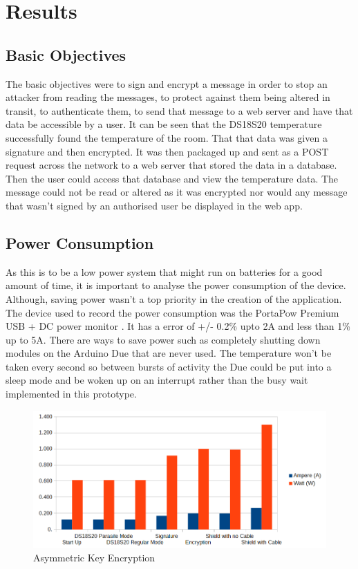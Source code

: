 \chapter{Results}
\label{res}



\section{Basic Objectives}

The basic objectives were to sign and encrypt a message in order to stop an attacker from reading the messages, to protect against them being altered in transit, to authenticate them, to send that message to a web server and have that data be accessible by a user. It can be seen that the DS18S20 temperature successfully found the temperature of the room. That that data was given a signature and then encrypted. It was then packaged up and sent as a POST request across the network to a web server that stored the data in a database. Then the user could access that database and view the temperature data. The message could not be read or altered as it was encrypted nor would any message that wasn't signed by an authorised user be displayed in the web app.

\section{Power Consumption}

As this is to be a low power system that might run on batteries for a good amount of time, it is important to analyse the power consumption of the device. Although, saving power wasn't a top priority in the creation of the application. The device used to record the power consumption was the PortaPow Premium USB + DC power monitor \cite{portapow}. It has a error of +/- 0.2\% upto 2A and less than 1\% up to 5A. There are ways to save power such as completely shutting down modules on the Arduino Due that are never used. The temperature won't be taken every second so between bursts of activity the Due could be put into a sleep mode and be woken up on an interrupt rather than the busy wait implemented in this prototype.


\begin{figure}[H]
	\centering
	\includegraphics[width=1.1\linewidth]{Figures/power.png}
	\caption{Asymmetric Key Encryption}
	\label{fig:power}
\end{figure}


